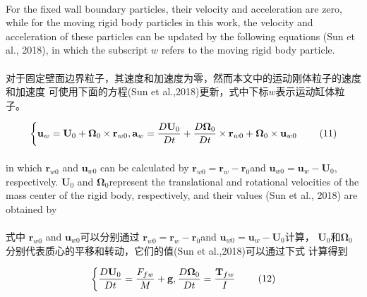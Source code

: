 \documentclass[UTF8]{ctexart}
\begin{document}
{{\paragraph{\quad}For the fixed wall boundary particles, their velocity and 
                acceleration are zero, while for the moving rigid body 
                particles in this work, the velocity and acceleration 
                of these particles can be updated by the following 
                equations (Sun et al., 2018), in which the subscript $ w$ 
                refers to the moving rigid body particle.
\paragraph{\quad}对于固定壁面边界粒子，其速度和加速度为零，然而本文中的运动刚体粒子的速度和加速度
            可使用下面的方程(Sun et al.,2018)更新，式中下标$w$表示运动缸体粒子。

\begin{equation}
   \left\{ \mathbf{u}_w =  \mathbf{U}_0 + \mathbf{\Omega}_0 \times \mathbf{r}_{w0}, \\
   \mathbf{a}_w = \frac{D \mathbf{U}_0}{Dt}+\frac{D \mathbf{\Omega}_0}{Dt}\times\mathbf{r}_{w0}+\mathbf{\Omega}_0\times\mathbf{u}_{w0} \right. \qquad (11)
\end{equation}

\paragraph{\quad}in which $\mathbf{r}_{w0}$ and $\mathbf{u}_{w0}$ can be calculated by
             $\mathbf{r}_{w0} = \mathbf{r}_w-\mathbf{r}_0 $and $\mathbf{u}_{w0} = \mathbf{u}_w-\mathbf{U}_0$, 
                respectively. $\mathbf{U}_0$ and $\mathbf{\Omega}_0$represent the translational and rotational 
                velocities of the mass center of the rigid body, respectively, and 
                their values (Sun et al., 2018) are obtained by
\paragraph{\quad}式中 $\mathbf{r}_{w0}$ and $\mathbf{u}_{w0}$可以分别通过
                    $\mathbf{r}_{w0} = \mathbf{r}_w-\mathbf{r}_0 $and $\mathbf{u}_{w0} = \mathbf{u}_w-\mathbf{U}_0$计算，
                    $\mathbf{U}_0$和$\mathbf{\Omega}_0$分别代表质心的平移和转动，它们的值(Sun et al.,2018)可以通过下式
                    计算得到

\begin{equation}
   \left\{ \frac{D \mathbf{U}_0}{Dt}=\frac{F_{fw}}{M}+\mathbf{g}, \\
   \frac{D \mathbf{\Omega}_0}{Dt} = \frac{\mathbf{T}_{fw}}{I} \right. \qquad (12)
\end{equation}

}}
\end{document}
